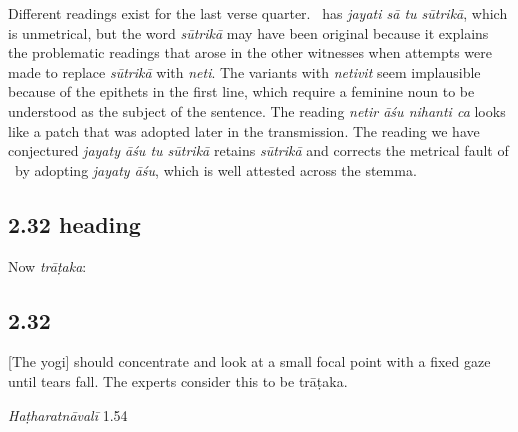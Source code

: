 \begin{ekdosis}
\begin{philcomm}[hp02_031]
Different readings exist for the last verse quarter. \etaOne\ has \emph{jayati sā tu sūtrikā}, which is unmetrical, but the word \emph{sūtrikā} may have been original because it explains the problematic readings that arose in the other witnesses when attempts were made to replace \emph{sūtrikā} with \emph{neti}. The variants with \emph{netivit} seem implausible because of the epithets in the first line, which require a feminine noun to be understood as the subject of the sentence. The reading \emph{netir āśu nihanti ca} looks like a patch that was adopted later in the transmission. The reading we have conjectured \emph{jayaty āśu tu sūtrikā} retains \emph{sūtrikā} and corrects the metrical fault of \etaOne\ by adopting \emph{jayaty āśu}, which is well attested across the stemma.
\end{philcomm}

\subsection*{2.32 heading}
\begin{translation}[hp02_032a]
Now \emph{trāṭaka}:
\end{translation}


\subsection*{2.32}
\begin{translation}[hp02_032]
{[}The yogi] should concentrate and look at a small focal point with a fixed gaze until tears fall. The experts consider this to be trāṭaka.
\end{translation}


\begin{testimonia}[hp02_032]
\emph{Haṭharatnāvalī} 1.54

\begin{versinnote}
\end{versinnote}


\end{testimonia}
\end{ekdosis}
